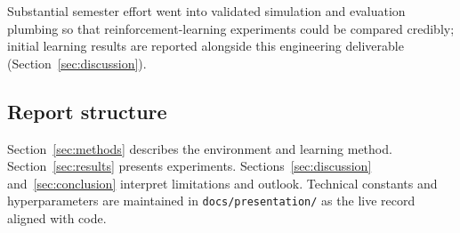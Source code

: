 Substantial semester effort went into validated simulation and evaluation plumbing so that reinforcement-learning experiments could be compared credibly; initial learning results are reported alongside this engineering deliverable (Section~\ref{sec:discussion}).

\subsection{Report structure}
Section~\ref{sec:methods} describes the environment and learning method.
Section~\ref{sec:results} presents experiments.
Sections~\ref{sec:discussion} and~\ref{sec:conclusion} interpret limitations and outlook.
Technical constants and hyperparameters are maintained in \texttt{docs/presentation/} as the live record aligned with code.

